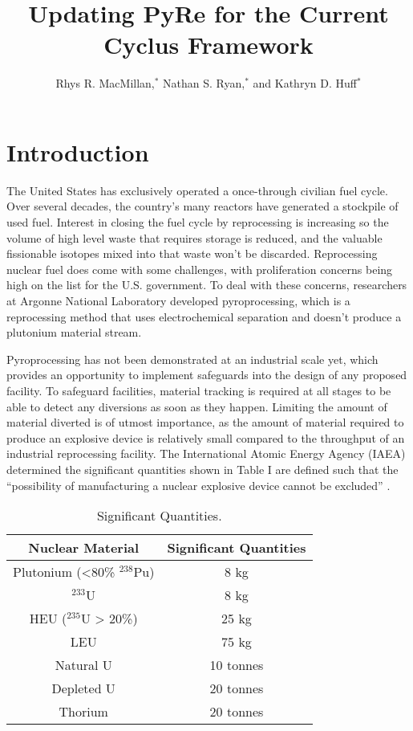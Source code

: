 \documentclass{anstrans}
\title{Updating PyRe for the Current Cyclus Framework}
\author{Rhys R. MacMillan,$^{*}$ Nathan S. Ryan,$^{*}$ and Kathryn D. Huff$^{*}$}
\institute{
$^{*}$Advanced Reactors and Fuel Cycles Group, University of Illinois, Urbana IL, rhysrm2@illinois.edu
}
\begin{document}
\section{Introduction}
The United States has exclusively operated a once-through civilian fuel cycle. 
Over several decades, the country’s many reactors have generated a stockpile of used fuel. Interest in closing the fuel cycle by reprocessing is increasing so the volume of high level waste that requires storage is reduced, and the valuable fissionable isotopes mixed into that waste won’t be discarded. Reprocessing nuclear fuel does come with some challenges, with proliferation concerns being high on the list for the U.S. government. To deal with these concerns, researchers at Argonne National Laboratory developed pyroprocessing, which is a reprocessing method that uses electrochemical separation and doesn’t produce a plutonium material stream. 

Pyroprocessing has not been demonstrated at an industrial scale yet, which provides an opportunity to implement safeguards into the design of any proposed facility. To safeguard facilities, material tracking is required at all stages to be able to detect any diversions as soon as they happen. Limiting the amount of material diverted is of utmost importance, as the amount of material required to produce an explosive device is relatively small compared to the throughput of an industrial reprocessing facility. The International Atomic Energy Agency (IAEA) determined the significant quantities shown in Table I are defined such that the “possibility of manufacturing a nuclear explosive device cannot be excluded” \cite{schanfein_iaea_2021}.

\begin{table}[H]
  \centering
  \caption{Significant Quantities.}
  \label{tab:sig_quant}
  \begin{tabular}{c c}
    \hline
    Nuclear Material&Significant Quantities\\
    \hline
    Plutonium (<80\% $^{238}$Pu)&8 kg\\
    $^{233}$U&8 kg\\
    HEU ($^{235}$U > 20\%)&25 kg\\
    LEU&75 kg\\
    Natural U&10 tonnes\\
    Depleted U&20 tonnes\\
    Thorium&20 tonnes\\
    \hline
  \end{tabular}
\end{table}
\end{document}
